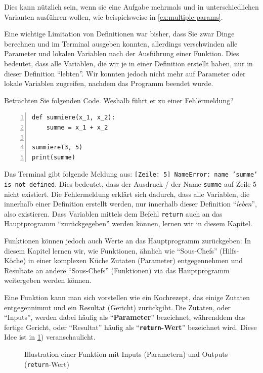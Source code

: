 Dies kann nützlich sein, wenn sie eine Aufgabe mehrmals und in unterschiedlichen Varianten ausführen wollen, wie beispielsweise in \cref{ex:multiple-params}.

Eine wichtige Limitation von Definitionen war bisher, dass Sie zwar Dinge berechnen und im Terminal ausgeben konnten, allerdings verschwinden alle Parameter und lokalen Variablen nach der Ausführung einer Funktion.  Dies bedeutet, dass alle Variablen, die wir je in einer Definition erstellt haben, nur in dieser Definition \enquote{lebten}. Wir konnten jedoch nicht mehr auf Parameter oder lokale Variablen zugreifen, nachdem das Programm beendet wurde.

\begin{myexample}\label{ex:sum-noreturn}
Betrachten Sie folgenden Code. Weshalb führt er zu einer Fehlermeldung?
\begin{lstlisting}[numbers=left]
def summiere(x_1, x_2):
    summe = x_1 + x_2
    
summiere(3, 5)
print(summe)
\end{lstlisting}
Das Terminal gibt folgende Meldung aus: \texttt{[Zeile: 5] NameError: name 'summe' is not defined}. Dies bedeutet, dass der Ausdruck / der Name \lstinline|summe| auf Zeile 5 nicht existiert. Die Fehlermeldung erklärt sich dadurch, dass alle Variablen, die innerhalb einer Definition erstellt werden, nur innerhalb dieser Definition \enquote{\textit{leben}}, also existieren. Dass Variablen mittels dem Befehl \lstinline|return| auch an das Hauptprogramm \enquote{zurückgegeben} werden können, lernen wir in diesem Kapitel.
\end{myexample}

Funktionen können jedoch auch Werte an das Hauptprogramm zurückgeben: In diesem Kapitel lernen wir, wie Funktionen, ähnlich wie \enquote{Sous-Chefs} (Hilfs-Köche) in einer komplexen Küche Zutaten (Parameter) entgegennehmen und Resultate an andere \enquote{Sous-Chefs} (Funktionen) via das Hauptprogramm weitergeben werden können.

Eine Funktion kann man sich vorstellen wie ein Kochrezept, das einige Zutaten entgegennimmt und ein Resultat (Gericht) zurückgibt. Die Zutaten, oder \enquote{Inputs}, werden dabei häufig als \enquote{\textbf{Parameter}} bezeichnet, währenddem das fertige Gericht, oder \enquote{Resultat} häufig als \enquote{\textbf{\lstinline|return|-Wert}} bezeichnet wird. Diese Idee ist in \cref{fig:funktion-einzeln}) veranschaulicht.

\begin{figure}[H]
	\centering
	\caption{Illustration einer Funktion mit Inputs (Parametern) und Outputs (\lstinline|return|-Wert)}
	\label{fig:funktion-einzeln}
\end{figure}

